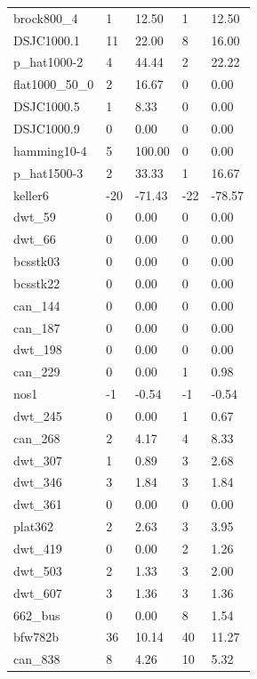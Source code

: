 \begin{table}[h!]
{\begin{tabular}{lllll}
            brock800\_4 & 1 & 12.50 & 1 & 12.50 \\
            DSJC1000.1 & 11 & 22.00 & 8 & 16.00 \\
            p\_hat1000-2 & 4 & 44.44 & 2 & 22.22 \\
            flat1000\_50\_0 & 2 & 16.67 & 0 & 0.00 \\
            DSJC1000.5 & 1 & 8.33 & 0 & 0.00 \\
            DSJC1000.9 & 0 & 0.00 & 0 & 0.00 \\
            hamming10-4 & 5 & 100.00 & 0 & 0.00 \\
            p\_hat1500-3 & 2 & 33.33 & 1 & 16.67 \\
            keller6 & -20 & -71.43 & -22 & -78.57 \\
            dwt\_59 & 0 & 0.00 & 0 & 0.00 \\
            dwt\_66 & 0 & 0.00 & 0 & 0.00 \\
            bcsstk03 & 0 & 0.00 & 0 & 0.00 \\
            bcsstk22 & 0 & 0.00 & 0 & 0.00 \\
            can\_144 & 0 & 0.00 & 0 & 0.00 \\
            can\_187 & 0 & 0.00 & 0 & 0.00 \\
            dwt\_198 & 0 & 0.00 & 0 & 0.00 \\
            can\_229 & 0 & 0.00 & 1 & 0.98 \\
            nos1 & -1 & -0.54 & -1 & -0.54 \\
            dwt\_245 & 0 & 0.00 & 1 & 0.67 \\
            can\_268 & 2 & 4.17 & 4 & 8.33 \\
            dwt\_307 & 1 & 0.89 & 3 & 2.68 \\
            dwt\_346 & 3 & 1.84 & 3 & 1.84 \\
            dwt\_361 & 0 & 0.00 & 0 & 0.00 \\
            plat362 & 2 & 2.63 & 3 & 3.95 \\
            dwt\_419 & 0 & 0.00 & 2 & 1.26 \\
            dwt\_503 & 2 & 1.33 & 3 & 2.00 \\
            dwt\_607 & 3 & 1.36 & 3 & 1.36 \\
            662\_bus & 0 & 0.00 & 8 & 1.54 \\
            bfw782b & 36 & 10.14 & 40 & 11.27 \\
            can\_838 & 8 & 4.26 & 10 & 5.32 \\

\end{tabular}}
\end{table}
